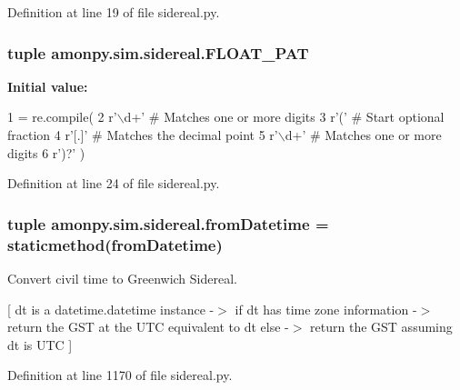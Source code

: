 Definition at line 19 of file sidereal.\-py.

\hypertarget{namespaceamonpy_1_1sim_1_1sidereal_ac016f678cf2cee161df382472e2d5949}{
\subsubsection[{F\-L\-O\-A\-T\-\_\-\-P\-A\-T}]{\setlength{\rightskip}{0pt plus 5cm}tuple amonpy.\-sim.\-sidereal.\-F\-L\-O\-A\-T\-\_\-\-P\-A\-T}}\label{namespaceamonpy_1_1sim_1_1sidereal_ac016f678cf2cee161df382472e2d5949}
{\bfseries Initial value\-:}
\begin{DoxyCode}
1 = re.compile(
2     \textcolor{stringliteral}{r'\(\backslash\)d+'}          \textcolor{comment}{# Matches one or more digits}
3     \textcolor{stringliteral}{r'('}            \textcolor{comment}{# Start optional fraction}
4       \textcolor{stringliteral}{r'[.]'}          \textcolor{comment}{# Matches the decimal point}
5       \textcolor{stringliteral}{r'\(\backslash\)d+'}          \textcolor{comment}{# Matches one or more digits}
6     \textcolor{stringliteral}{r')?'} )
\end{DoxyCode}


Definition at line 24 of file sidereal.\-py.

\hypertarget{namespaceamonpy_1_1sim_1_1sidereal_a3ad086c7aee5c5d5a6838ad7da5716e3}{
\subsubsection[{from\-Datetime}]{\setlength{\rightskip}{0pt plus 5cm}tuple amonpy.\-sim.\-sidereal.\-from\-Datetime = staticmethod(from\-Datetime)}}\label{namespaceamonpy_1_1sim_1_1sidereal_a3ad086c7aee5c5d5a6838ad7da5716e3}


Convert civil time to Greenwich Sidereal. 

\mbox{[} dt is a datetime.\-datetime instance -\/$>$ if dt has time zone information -\/$>$ return the G\-S\-T at the U\-T\-C equivalent to dt else -\/$>$ return the G\-S\-T assuming dt is U\-T\-C \mbox{]} 

Definition at line 1170 of file sidereal.\-py.

